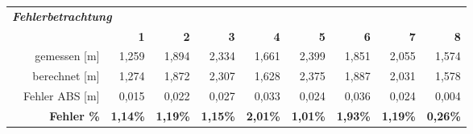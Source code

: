 \begin{table}[h]
\begin{tabular}{r|rrr|r|r|r|r|rrr}
    \multicolumn{11}{l}{\textit{\textbf{Fehlerbetrachtung}}} \\
    \multicolumn{1}{r}{} &       &       & \multicolumn{1}{r}{\textbf{1}} & \multicolumn{1}{r}{\textbf{2}} & \multicolumn{1}{r}{\textbf{3}} & \multicolumn{1}{r}{\textbf{4}} & \multicolumn{1}{r}{\textbf{5}} & \textbf{6} & \textbf{7} & \textbf{8} \\
\cline{2-11}    \multicolumn{1}{r}{} & \multicolumn{2}{r}{gemessen [m]} & \multicolumn{1}{r}{1,259} & \multicolumn{1}{r}{1,894} & \multicolumn{1}{r}{2,334} & \multicolumn{1}{r}{1,661} & \multicolumn{1}{r}{2,399} & 1,851 & 2,055 & 1,574 \\
    \multicolumn{1}{r}{} & \multicolumn{2}{r}{berechnet [m]} & \multicolumn{1}{r}{1,274} & \multicolumn{1}{r}{1,872} & \multicolumn{1}{r}{2,307} & \multicolumn{1}{r}{1,628} & \multicolumn{1}{r}{2,375} & 1,887 & 2,031 & 1,578 \\
    \multicolumn{1}{r}{} & \multicolumn{2}{r}{Fehler ABS [m]} & \multicolumn{1}{r}{0,015} & \multicolumn{1}{r}{0,022} & \multicolumn{1}{r}{0,027} & \multicolumn{1}{r}{0,033} & \multicolumn{1}{r}{0,024} & 0,036 & 0,024 & 0,004 \\
    \multicolumn{1}{r}{} & \multicolumn{2}{r}{\textbf{Fehler \%}} & \multicolumn{1}{r}{\textbf{1,14\%}} & \multicolumn{1}{r}{\textbf{1,19\%}} & \multicolumn{1}{r}{\textbf{1,15\%}} & \multicolumn{1}{r}{\textbf{2,01\%}} & \multicolumn{1}{r}{\textbf{1,01\%}} & \textbf{1,93\%} & \textbf{1,19\%} & \textbf{0,26\%} \\
    \end{tabular}%
\end{table}%

